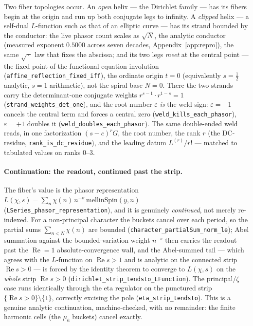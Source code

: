 \documentclass[11pt]{article}
\theoremstyle{definition}
\renewcommand{\Re}{\operatorname{Re}}
\begin{document}
Two fiber topologies occur. An \emph{open} helix --- the Dirichlet family --- has its fibers begin at
the origin and run up both conjugate legs to infinity. A \emph{clipped} helix --- a self-dual
$L$-function such as that of an elliptic curve --- has its strand bounded by the conductor: the live
phasor count scales as $\sqrt N$, the analytic conductor (measured exponent $0.5000$ across seven
decades, Appendix~\ref{app:repro}), the same $\sqrt{\,\cdot\,}$ law that fixes the abscissa; and its
two legs \emph{meet} at the central point --- the fixed point of the functional-equation involution
(\texttt{affine\_reflection\_fixed\_iff}), the ordinate origin $t=0$ (equivalently
$s=\tfrac12$ analytic, $s=1$ arithmetic), not the spiral base $N=0$. There the two strands carry the
determinant-one conjugate weights $r^{s-1}\!\cdot r^{1-s}=1$ (\texttt{strand\_weights\_det\_one}), and
the root number $\varepsilon$ \emph{is} the weld sign: $\varepsilon=-1$ cancels the central term and
forces a central zero (\texttt{weld\_kills\_each\_phasor}), $\varepsilon=+1$ doubles it
(\texttt{weld\_doubles\_each\_phasor}). The same double-ended weld reads, in one factorization
$(s-c)^r G$, the root number, the rank $r$ (the DC-residue, \texttt{rank\_is\_dc\_residue}), and the
leading datum $L^{(r)}/r!$ --- matched to tabulated values on ranks $0$–$3$.

\paragraph{Continuation: the readout, continued past the strip.} The fiber's value is the phasor
representation $L(\chi,s)=\sum_n\chi(n)\,n^{-\sigma}\,\mathrm{mellinSpin}(y,n)$
(\texttt{LSeries\_phasor\_representation}), and it is genuinely \emph{continued}, not merely
re-indexed. For a non-principal character the buckets cancel over each period, so the partial sums
$\sum_{n<N}\chi(n)$ are bounded (\texttt{character\_partialSum\_norm\_le}); Abel summation against the
bounded-variation weight $n^{-s}$ then carries the readout past the $\Re=1$ absolute-convergence wall,
and the Abel-summed tail --- which agrees with the $L$-function on $\Re s>1$ and is analytic on the
connected strip $\Re s>0$ --- is forced by the identity theorem to converge to $L(\chi,s)$ on the
\emph{whole} strip $\Re s>0$ (\texttt{dirichlet\_strip\_tendsto\_LFunction}). The principal/$\zeta$
case runs identically through the eta regulator on the punctured strip $\{\Re s>0\}\setminus\{1\}$,
correctly excising the pole (\texttt{eta\_strip\_tendsto}). This is a genuine analytic continuation,
machine-checked, with no remainder: the finite harmonic cells (the $\mu_6$ buckets) cancel exactly.
\end{document}
